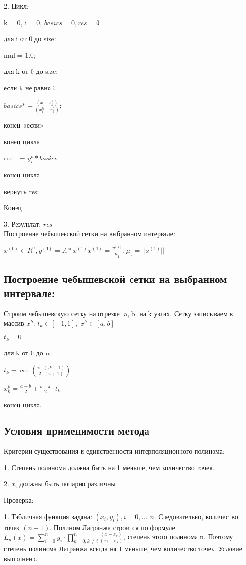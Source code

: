 \documentclass{article}
\begin{document}
	2. Цикл:
	
	k = 0, i = 0, $basics = 0, res = 0$
	
	для i от 0 до size: 
	
	\quad mul = 1.0;
	
	\quad для k от 0 до size:
		
	\qquad если k не равно i:
				
	\quad \qquad $basics *=\frac{(x - x^h_k)}{(x^h_i-x^h_k)}$;
			
	\qquad конец «если»
		
	\quad конец цикла
		
	\quad res += $y^h_i * basics$
	
	конец цикла
	
	вернуть res;

	
	Конец
	
	3. Результат: $res$
	~\\
	
	Построение чебышевской сетки на выбранном интервале:
	
	$x^{(0)} \in R^n,y^{(1)} = A*x^{(1)} x^{(1)} = \frac{y^{(1)}}{\mu_1}, \mu_1 = ||x^{(1)}||$
	
	
	\subsection{Построение чебышевской сетки на выбранном интервале:}
	
	Строим чебышевскую сетку на отрезке [a, b] на k узлах. Сетку записываем в массив $x^h$:
	$t_k \in [-1, 1], $
	$x^h \in [a, b]$
	
	$t_k = 0 $
	
	для k от 0 до n:
	
	\quad $t_k = \cos(\frac{\pi \cdot (2k+1)}{2 \cdot (n+1)})$
	
	\quad $x^h_k = \frac{a+b}{2} + \frac{b-a}{2} \cdot t_k$
	
	конец цикла.
	
	\subsection{Условия применимости метода}
	Критерии существования и единственности интерполяционного полинома: 
	
	1. Степень полинома должна быть на 1 меньше, чем количество точек.
	
	2. $x_i$ должны быть попарно различны
	
	Проверка: 
	
	1.  Табличная функция задана: $(x_i,y_i ),i=0,…,n$. Следовательно, количество точек $(n+1)$. Полином Лагранжа строится по формуле $L_n (x)=\sum_{i=0}^{n}y_i\cdot\prod\limits_{k = 0, k \neq i}^n \frac{(x - x_k)}{(x_i-x_k)}$, степень этого полинома n. Поэтому степень полинома Лагранжа всегда на 1 меньше, чем количество точек. Условие выполнено.
	
\end{document}
